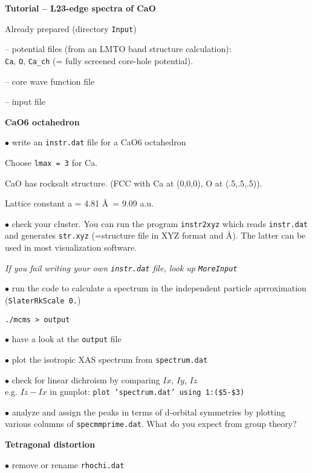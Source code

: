 \documentclass[landscape]{slides}
\begin{document}
\begin{slide}

\begin{center}
{\large\bf Tutorial -- L23-edge spectra of CaO}
\end{center}
Already prepared (directory {\tt Input}) 

-- potential files  (from an LMTO band structure
calculation):\\ {\tt Ca}, {\tt O}, {\tt Ca\_ch} 
(= fully screened core-hole potential).

-- core wave function file 

-- input file 


{\bf CaO6 octahedron}

$\bullet$ write an {\tt instr.dat} file for a CaO6 octahedron

Choose {\tt lmax = 3} for Ca.

CaO has rocksalt structure.\quad
(FCC with Ca at (0,0,0), O at (.5,.5,.5)).

Lattice constant a = 4.81 \AA\ = 9.09 a.u.


$\bullet$ check your cluster.
You can run the program {\tt instr2xyz}
which reads {\tt instr.dat} and generates {\tt str.xyz}
(=structure file in XYZ format and \AA).
The latter can be used 
in most visualization software.

\begin{small}
{\em If you fail writing your own {\tt instr.dat} file, look up {\tt MoreInput}}
\end{small}

$\bullet$ run the code to calculate a spectrum in the independent
particle aprroximation ({\tt SlaterRkScale   0.})

{\tt ./mcms > output}

$\bullet$ have a look at the {\tt output} file

$\bullet$ plot the isotropic XAS spectrum from {\tt spectrum.dat} 

$\bullet$ check for linear dichroism by comparing $Ix$, $Iy$, $Iz$\\
e.g. $Iz-Ix$ in gnuplot: {\tt plot 'spectrum.dat' using 1:(\$5-\$3)}

$\bullet$ analyze and assign the peaks in terms of d-orbital symmetries
by plotting various columns of {\tt specmmprime.dat}.
What do you expect from group theory?

{\bf Tetragonal distortion}

$\bullet$ remove or rename {\tt rhochi.dat} 


\end{slide}
\end{document}
